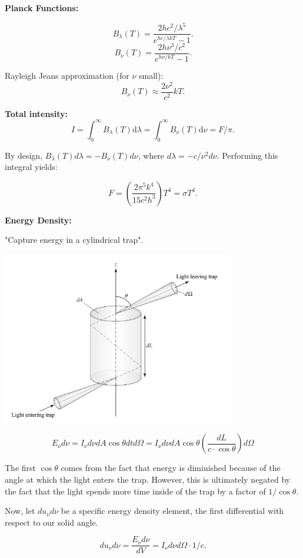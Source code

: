 \documentclass[12pt]{article}
\begin{document}
\textbf{Planck Functions:}

\[B_{\lambda}(T) = \frac{2hc^2/\lambda^5}{e^{hc/\lambda kT} - 1}.\]
\[B_{\nu}(T) = \frac{2h\nu^3/c^2}{e^{h\nu/kT} - 1}.\]

Rayleigh Jeans approximation (for $\nu$ small):
\[B_{\nu}(T) \approx \frac{2\nu^2}{c^2}kT.\]

\textbf{Total intensity:}
\[I = \int_0^{\infty} B_{\lambda}(T)\mathrm{d}\lambda =  \int_0^{\infty} B_{\nu}(T)\mathrm{d}\nu = F/\pi.\]

By design, $B_{\lambda}(T)d\lambda = -B_{\nu}(T)d\nu$, where $d\lambda = -c/\nu^2 d\nu$. Performing this integral yields:

\[F = \left(\frac{2\pi^5 k^4}{15c^2 h^3}\right)T^4 = \sigma T^4.\]

\textbf{Energy Density:}

"Capture energy in a cylindrical trap". 

\begin{center}
    \includegraphics[width=10cm]{images/energydensity.png}
\end{center}

\[E_{\nu}d\nu = I_{\nu}d\nu dA\cos{\theta}dtd\Omega = I_{\nu}d\nu dA\cos{\theta}\left(\frac{dL}{c\cdot \cos{\theta}}\right)d\Omega\]

The first $\cos{\theta}$ comes from the fact that energy is diminished because of the angle at which the light enters the trap. However, this is ultimately negated by the fact that the light spends more time inside of the trap by a factor of $1/\cos{\theta}$. 

Now, let $du_{\nu}d\nu$ be a specific energy density element, the first differential with respect to our solid angle. 

\[du_{\nu}d\nu = \frac{E_{\nu}d\nu}{dV} = I_{\nu}d\nu d\Omega \cdot 1/c.\]
\end{document}
